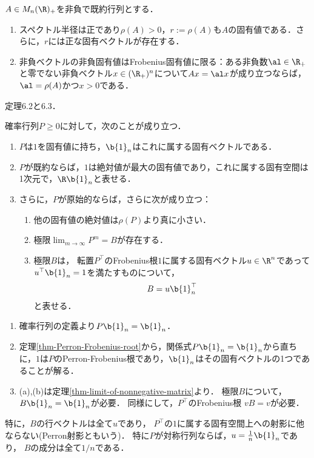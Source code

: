 \documentclass[uplatex,dvipdfmx]{jsarticle}
\begin{document}
\begin{theorem}\label{thm-Perron-Frobenius-root}
    $A\in M_n(\R)_+$を非負で既約行列とする．
    \begin{enumerate}
        \item スペクトル半径は正であり$\rho(A)>0$，$r:=\rho(A)$も$A$の固有値である．さらに，$r$には正な固有ベクトルが存在する．
        \item 非負ベクトルの非負固有値はFrobenius固有値に限る：ある非負数$\al\in\R_+$と零でない非負ベクトル$x\in(\R_+)^n$について$Ax=\al x$が成り立つならば，$\al=\rho(A)$かつ$x>0$である．
    \end{enumerate}
\end{theorem}
\begin{Proof}
    \cite{岩堀77-線型不等式}定理6.2と6.3．
\end{Proof}

\begin{proposition}[確率行列の固有値と極限]
    確率行列$P\ge0$に対して，次のことが成り立つ．
    \begin{enumerate}
        \item $P$は$1$を固有値に持ち，$\b{1}_n$はこれに属する固有ベクトルである．
        \item $P$が既約ならば，$1$は絶対値が最大の固有値であり，これに属する固有空間は1次元で，$\R\b{1}_n$と表せる．
        \item さらに，$P$が原始的ならば，さらに次が成り立つ：
        \begin{enumerate}
            \item 他の固有値の絶対値は$\rho(P)$より真に小さい．
            \item 極限$\lim_{m\to\infty}P^m=B$が存在する．
            \item 極限$B$は，
            転置$P^\top$のFrobenius根$1$に属する固有ベクトル$u\in\R^n$であって$u^\top\b{1}_n=1$を満たすものについて，
            \[B=u\b{1}_n^\top\]
            と表せる．
        \end{enumerate}
    \end{enumerate}
\end{proposition}
\begin{Proof}\mbox{}
    \begin{enumerate}
        \item 確率行列の定義より$P\b{1}_n=\b{1}_n$．
        \item 定理\ref{thm-Perron-Frobenius-root}から，関係式$P\b{1}_n=\b{1}_n$から直ちに，$1$は$P$のPerron-Frobenius根であり，$\b{1}_n$はその固有ベクトルの1つであることが解る．
        \item (a),(b)は定理\ref{thm-limit-of-nonnegative-matrix}より．
        極限$B$について，$B\b{1}_n=\b{1}_n$が必要．
        同様にして，$P^\top$のFrobenius根
        $vB=v$が必要．
    \end{enumerate}
\end{Proof}
\begin{remark}\label{remark-limit-of-probability-matrix}
    特に，$B$の行ベクトルは全て$u$であり，
    $P^\top$の$1$に属する固有空間上への射影に他ならない(Perron射影ともいう)．
    特に$P$が対称行列ならば，$u=\frac{1}{n}\b{1}_n$であり，
    $B$の成分は全て$1/n$である．
\end{remark}
\end{document}
